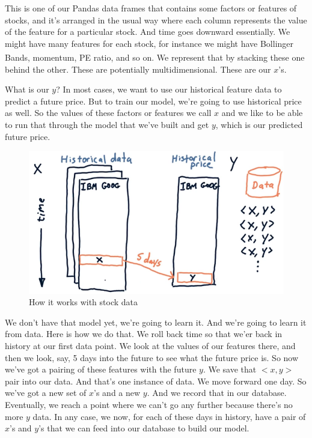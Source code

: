 \documentclass[12pt]{article}
\begin{document}
This is one of our Pandas data frames that contains some factors or features of stocks, and it's arranged in the usual way where each column represents the value of the feature for a particular stock. And time goes downward essentially. We might have many features for each stock, for instance we might have Bollinger Bands\textsuperscript\textregistered, momentum, PE ratio, and so on. We represent that by stacking these one behind the other. These are potentially multidimensional. These are our $x$'s.

What is our $y$? In most cases, we want to use our historical feature data to predict a future price. But to train our model, we're going to use historical price as well. So the values of these factors or features we call $x$ and we like to be able to run that through the model that we've built and get $y$, which is our predicted future price. 

\begin{figure}[!ht]
\centering
\includegraphics[scale=0.45]{fig/fig73}
\caption{How it works with stock data}
\end{figure}

We don't have that model yet, we're going to learn it. And we're going to learn it from data. Here is how we do that. We roll back time so that we'er back in history at our first data point. We look at the values of our features there, and then we look, say, 5 days into the future to see what the future price is. So now we've got a pairing of these features with the future $y$. We save that $<x, y>$ pair into our data. And that's one instance of data. We move forward one day. So we've got a new set of $x$'s and a new $y$. And we record that in our database. Eventually, we reach a point where we can't go any further because there's no more $y$ data. In any case, we now, for each of these days in history, have a pair of $x$'s and $y$'s that we can feed into our database to build our model. 
\end{document}
